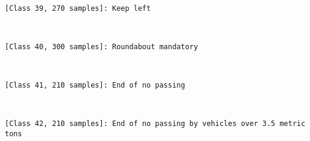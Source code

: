 \documentclass[11pt]{article}
\begin{document}
    \begin{center}
    \end{center}
    { \hspace*{\fill} \\}
    
    \begin{Verbatim}[commandchars=\\\{\}]
[Class 39, 270 samples]: Keep left

    \end{Verbatim}

    \begin{center}
    \end{center}
    { \hspace*{\fill} \\}
    
    \begin{Verbatim}[commandchars=\\\{\}]
[Class 40, 300 samples]: Roundabout mandatory

    \end{Verbatim}

    \begin{center}
    \end{center}
    { \hspace*{\fill} \\}
    
    \begin{Verbatim}[commandchars=\\\{\}]
[Class 41, 210 samples]: End of no passing

    \end{Verbatim}

    \begin{center}
    \end{center}
    { \hspace*{\fill} \\}
    
    \begin{Verbatim}[commandchars=\\\{\}]
[Class 42, 210 samples]: End of no passing by vehicles over 3.5 metric tons

    \end{Verbatim}
\end{document}
